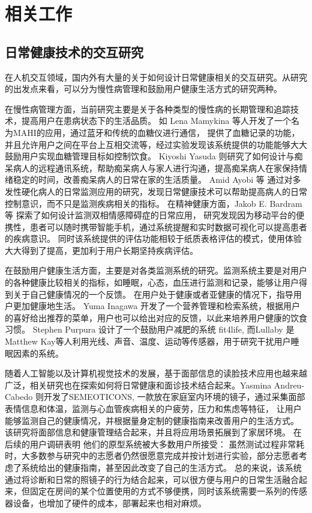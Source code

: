 \chapter{相关工作}

\section{日常健康技术的交互研究}

在人机交互领域，国内外有大量的关于如何设计日常健康相关的交互研究。从研究的出发点来看，可以分为慢性病管理和鼓励用户健康生活方式的研究两种。

在慢性病管理方面，当前研究主要是关于各种类型的慢性病的长期管理和追踪技术，提高用户在患病状态下的生活品质。
如 Lena Mamykina \cite{mamykina2008mahi:}等人开发了一个名为MAHI的应用，通过蓝牙和传统的血糖仪进行通信，
提供了血糖记录的功能，并且允许用户之间在平台上互相交流等，经过实验发现该系统提供的功能能够大大鼓励用户实现血糖管理目标如控制饮食。
Kiyoshi Yasuda \cite{yasuda2009remote}则研究了如何设计与痴呆病人的远程通讯系统，帮助痴呆病人与家人进行沟通，提高痴呆病人在家保持情绪稳定的时间，改善痴呆病人的日常在家的生活质量。
Amid Ayobi 等\cite{ayobi2017quantifying} 通过对多发性硬化病人的日常监测应用的研究，发现日常健康技术可以帮助提高病人的日常控制意识，而不只是监测疾病相关的指标。
在精神健康方面，Jakob E. Bardram等 \cite{bardram2013designing}探索了如何设计监测双相情感障碍症的日常应用， 研究发现因为移动平台的便携性，患者可以随时携带智能手机，通过系统提醒和实时数据可视化可以提高患者的疾病意识。
同时该系统提供的评估功能相较于纸质表格评估的模式，使用体验大大得到了提高，更加利于用户长期坚持疾病评估。

在鼓励用户健康生活方面，主要是对各类监测系统的研究。监测系统主要是对用户的各种健康比较相关的指标，如睡眠，心态，血压进行监测和记录，能够让用户得到关于自己健康情况的一个反馈。
在用户处于健康或者亚健康的情况下，指导用户更加健康地生活。 
Yuma Inagawa  \cite{Inagawa2013A} 开发了一个营养管理和检索系统，根据用户的喜好给出推荐的菜单，用户也可以给出对应的反馈，以此来培养用户健康的饮食习惯。
Stephen Purpura \cite{purpura2011fit4life} 设计了一个鼓励用户减肥的系统 fit4life,  而Lullaby  \cite{kay2012lullaby} 是Matthew Kay等人利用光线、声音、温度、运动等传感器，用于研究干扰用户睡眠因素的系统。

随着人工智能以及计算机视觉技术的发展，基于面部信息的读脸技术应用也越来越广泛，相关研究也在探索如何将日常健康和面诊技术结合起来。Yasmina Andreu-Cabedo  \cite{andreu2015mirror}则开发了SEMEOTICONS, 一款放在家庭室内环境的镜子，通过采集面部表情信息和体温，监测与心血管疾病相关的户疲劳，压力和焦虑等特征， 让用户能够监测自己的健康情况，并根据量身定制的健康指南来改善用户的生活方式。
 该研究将面部信息和健康管理结合起来，并且将应用场景拓展到了家居环境。
 在后续的用户调研表明\cite{coppini2017user} 他们的原型系统被大多数用户所接受： 虽然测试过程非常耗时，大多数参与研究中的志愿者仍然很愿意完成并按计划进行实验，部分志愿者考虑了系统给出的健康指南，甚至因此改变了自己的生活方式。
总的来说，该系统通过将诊断和日常的照镜子的行为结合起来，可以很方便与用户的日常生活融合起来，但固定在房间的某个位置使用的方式不够便携，同时该系统需要一系列的传感器设备，也增加了硬件的成本，部署起来也相对麻烦。

